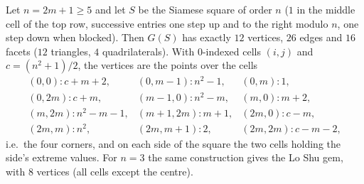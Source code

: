\begin{proposition}
\label{prop:siamese-12}
Let $n=2m+1\ge5$ and let $S$ be the Siamese square of order $n$ ($1$ in the
middle cell of the top row, successive entries one step up and to the right
modulo $n$, one step down when blocked).  Then $G(S)$ has exactly $12$
vertices, $26$ edges and $16$ facets ($12$ triangles, $4$ quadrilaterals).
With $0$-indexed cells $(i,j)$ and $c=(n^2+1)/2$, the vertices are the
points over the cells
\[
\begin{array}{lll}
(0,0)\colon c+m+2, & (0,m-1)\colon n^2-1, & (0,m)\colon 1, \\
(0,2m)\colon c+m, & (m-1,0)\colon n^2-m, & (m,0)\colon m+2, \\
(m,2m)\colon n^2-m-1, & (m+1,2m)\colon m+1, & (2m,0)\colon c-m, \\
(2m,m)\colon n^2, & (2m,m+1)\colon 2, & (2m,2m)\colon c-m-2,
\end{array}
\]
i.e.\ the four corners, and on each side of the square the two cells holding
the side's extreme values.  For $n=3$ the same construction gives the Lo Shu
gem, with $8$ vertices (all cells except the centre).
\end{proposition}

